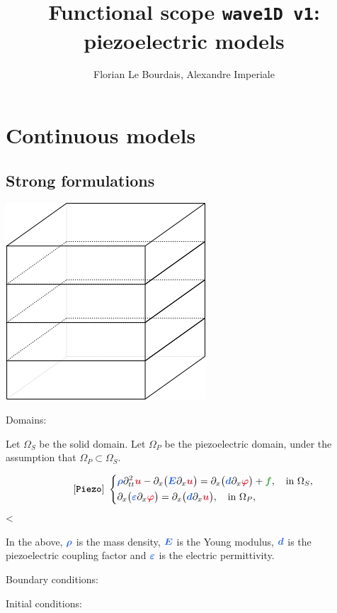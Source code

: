 \documentclass[11pt,a4paper]{article}
\title{Functional scope \texttt{wave1D v1}: piezoelectric models}
\author[1]{Florian Le Bourdais, Alexandre Imperiale}
\newcommand{\unknown}[1]{\bm{{\color{myred}{#1}}}}
\newcommand{\param}[1]{\bm{{\color{myhyperblue}{#1}}}}
\newcommand{\data}[1]{\bm{{\color{mygreen}{#1}}}}
\newcommand{\keyword}[1]{[\texttt{\textbf{#1}}]\!\,}
\begin{document}
% 

\maketitle

\section{Continuous models}
\subsection{Strong formulations}
\includegraphics[scale=1]{figures/1dstack.png} 

Domains: 

Let $\Omega_S$ be the solid domain.
Let $\Omega_P$ be the piezoelectric domain, under the assumption that  $\Omega_P \subset  \Omega_S$.

\begin{equation*}
\quad \quad
\keyword{Piezo}~
\left\lbrace
\begin{aligned}
& \param{\rho}\partial^2_{tt} \unknown{u} - \partial_x\big( \param{E} \partial_x \unknown{u} \big) = \partial_x\big( \param{d} \partial_x \unknown{\varphi} \big) + \data{f},\quad \text{in }\Omega_S,\\
& \partial_x\big( \param{\varepsilon} \partial_x \unknown{\varphi} \big) =  \partial_x\big( \param{d} \partial_x \unknown{u} \big),\quad \text{in }\Omega_P,\\
\end{aligned}
\right.
\end{equation*}<

In the above, $\param{\rho}$ is the mass density, $\param{E}$ is the Young modulus, $\param{d}$ is the piezoelectric coupling factor and $\param{\varepsilon}$ is the electric permittivity.

Boundary conditions:

Initial conditions:
\end{document}

